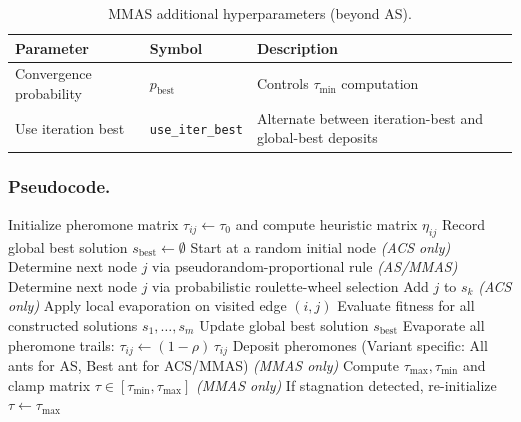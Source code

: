 \begin{table}[H]
\centering
\caption{MMAS additional hyperparameters (beyond AS).}
\label{tab:mmas-params}
\begin{tabular}{l l p{7cm}}
\hline
\textbf{Parameter} & \textbf{Symbol} & \textbf{Description} \\
\hline
Convergence probability & $p_{\text{best}}$        & Controls $\tau_{\min}$ computation \\
Use iteration best      & \texttt{use\_iter\_best}  & Alternate between iteration-best and global-best deposits \\
\hline
\end{tabular}
\end{table}

\subsubsection{Pseudocode.}

\begin{algorithm}[H]
\caption{Ant Colony Optimisation (General Framework)}
\label{alg:aco}
\begin{algorithmic}[1]
  \State Initialize pheromone matrix $\tau_{ij} \gets \tau_0$ and compute heuristic matrix $\eta_{ij}$
  \State Record global best solution $s_{\text{best}} \gets \emptyset$
      \State Start at a random initial node
        \State \textit{(ACS only)} Determine next node $j$ via pseudorandom-proportional rule
        \State \textit{(AS/MMAS)} Determine next node $j$ via probabilistic roulette-wheel selection
        \State Add $j$ to $s_k$
        \State \textit{(ACS only)} Apply local evaporation on visited edge $(i, j)$
      \EndWhile
    \EndFor
    \State Evaluate fitness for all constructed solutions $s_1, \dots, s_m$
    \State Update global best solution $s_{\text{best}}$
    \State Evaporate all pheromone trails: $\tau_{ij} \gets (1 - \rho)\,\tau_{ij}$
    \State Deposit pheromones (Variant specific: All ants for AS, Best ant for ACS/MMAS)
    \State \textit{(MMAS only)} Compute $\tau_{\max}, \tau_{\min}$ and clamp matrix $\tau \in [\tau_{\min}, \tau_{\max}]$
    \State \textit{(MMAS only)} If stagnation detected, re-initialize $\tau \gets \tau_{\max}$
  \EndFor
\end{algorithmic}
\end{algorithm}

